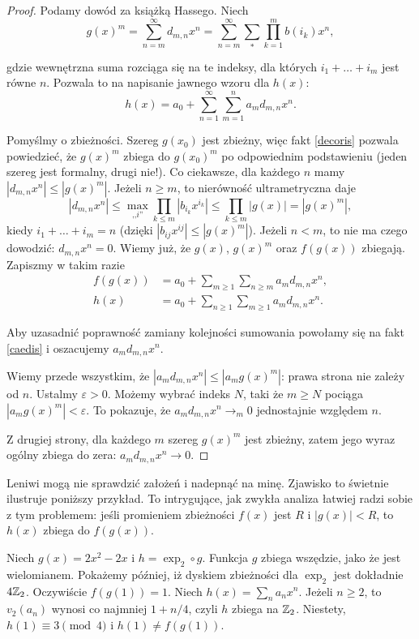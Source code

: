 \begin{proof}
	Podamy dowód za książką Hassego.
	Niech
	\[
		g(x)^m = \sum_{n=m}^\infty d_{m, n} x^n = \sum_{n=m}^\infty \sum_{*} \prod_{k=1}^m b(i_k) x^n,
	\]

	gdzie wewnętrzna suma rozciąga się na te indeksy, dla których $i_1 + \ldots + i_m$ jest równe $n$.
	Pozwala to na napisanie jawnego wzoru dla $h(x)$:
	\[
		h(x) = a_0 + \sum_{n = 1}^\infty \sum_{m = 1}^n a_m d_{m, n} x^n.
	\]

	Pomyślmy o zbieżności.
	Szereg $g(x_0)$ jest zbieżny, więc fakt \ref{decoris} pozwala powiedzieć, że $g(x)^m$ zbiega do $g(x_0)^m$ po odpowiednim podstawieniu (jeden szereg jest formalny, drugi nie!).
	Co ciekawsze, dla każdego $n$ mamy $|d_{m,n}x^n| \le |g(x)^m|$.
	Jeżeli $n \ge m$, to nierówność ultrametryczna daje
	\[
		|d_{m,n}x^n| \le \max_{\mbox{,,}i\mbox{''}} \prod_{k \le m} |b_{i_k} x^{i_k}| \le \prod_{k \le m} |g(x)| = |g(x)^m|,
	\]
	kiedy $i_1 + \ldots + i_m = n$ (dzięki $|b_{ij} x^{ij}| \le |g(x)^m|$).
	Jeżeli $n < m$, to nie ma czego dowodzić: $d_{m,n}x^n = 0$.
	Wiemy już, że $g(x)$, $g(x)^m$ oraz $f(g(x))$ zbiegają.
	Zapiszmy w takim razie
	\begin{align*}
	 	f(g(x))	& = a_0 + \sum_{m \ge 1} \sum_{n \ge m} a_m d_{m,n}x^n,\\
		h(x) & = a_0 + \sum_{n \ge 1} \sum_{m \ge 1} a_md_{m,n} x^n.
	\end{align*}

	Aby uzasadnić poprawność zamiany kolejności sumowania powołamy się na fakt \ref{caedis} i oszacujemy $a_md_{m,n}x^n$.

	Wiemy przede wszystkim, że $|a_md_{m,n}x^n| \le |a_mg(x)^m|$: prawa strona nie zależy od $n$.
	Ustalmy $\varepsilon > 0$.
	Możemy wybrać indeks $N$, taki że $m \ge N$ pociąga $|a_mg(x)^m| < \varepsilon$.
	To pokazuje, że $a_md_{m,n}x^n \to_m 0$ jednostajnie względem $n$.

	Z drugiej strony, dla każdego $m$ szereg $g(x)^m$ jest zbieżny, zatem jego wyraz ogólny zbiega do zera: $a_m d_{m,n}x^n \to 0$.
\end{proof}

Leniwi mogą nie sprawdzić założeń i nadepnąć na minę.
Zjawisko to świetnie ilustruje poniższy przykład.
To intrygujące, jak zwykła analiza łatwiej radzi sobie z tym problemem: jeśli promieniem zbieżności $f(x)$ jest $R $ i $|g(x)| < R $, to $h(x)$ zbiega do $f(g(x))$.

\begin{przyklad}\label{leniwy}
	Niech $g(x) = 2x^2 - 2x$ i $h = \exp_2 \circ g$.
	Funkcja $g$ zbiega wszędzie, jako że jest wielomianem.
	Pokażemy później, iż dyskiem zbieżności dla $\exp_2$ jest dokładnie $4\mathbb Z_2$.
	Oczywiście $f(g(1)) = 1$.
	Niech $h(x) = \sum_n a_n x^n$.
	Jeżeli $n \ge 2$, to $v_2(a_n)$ wynosi co najmniej $1 + n / 4$, czyli $h$ zbiega na $\mathbb Z_2$.
	Niestety, $h(1) \equiv 3 \pmod {4}$ i $h(1) \neq f(g(1))$.
\end{przyklad}

